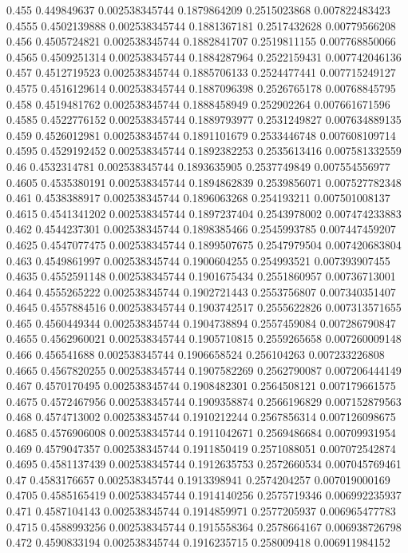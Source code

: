 {0.455 0.449849637 0.002538345744 0.1879864209 0.2515023868 0.007822483423
0.4555 0.4502139888 0.002538345744 0.1881367181 0.2517432628 0.00779566208
0.456 0.4505724821 0.002538345744 0.1882841707 0.2519811155 0.007768850066
0.4565 0.4509251314 0.002538345744 0.1884287964 0.2522159431 0.007742046136
0.457 0.4512719523 0.002538345744 0.1885706133 0.2524477441 0.007715249127
0.4575 0.4516129614 0.002538345744 0.1887096398 0.2526765178 0.00768845795
0.458 0.4519481762 0.002538345744 0.1888458949 0.252902264 0.007661671596
0.4585 0.4522776152 0.002538345744 0.1889793977 0.2531249827 0.007634889135
0.459 0.4526012981 0.002538345744 0.1891101679 0.2533446748 0.007608109714
0.4595 0.4529192452 0.002538345744 0.1892382253 0.2535613416 0.007581332559
0.46 0.4532314781 0.002538345744 0.1893635905 0.2537749849 0.007554556977
0.4605 0.4535380191 0.002538345744 0.1894862839 0.2539856071 0.007527782348
0.461 0.4538388917 0.002538345744 0.1896063268 0.254193211 0.007501008137
0.4615 0.4541341202 0.002538345744 0.1897237404 0.2543978002 0.007474233883
0.462 0.4544237301 0.002538345744 0.1898385466 0.2545993785 0.007447459207
0.4625 0.4547077475 0.002538345744 0.1899507675 0.2547979504 0.007420683804
0.463 0.4549861997 0.002538345744 0.1900604255 0.254993521 0.007393907455
0.4635 0.4552591148 0.002538345744 0.1901675434 0.2551860957 0.00736713001
0.464 0.4555265222 0.002538345744 0.1902721443 0.2553756807 0.007340351407
0.4645 0.4557884516 0.002538345744 0.1903742517 0.2555622826 0.007313571655
0.465 0.4560449344 0.002538345744 0.1904738894 0.2557459084 0.007286790847
0.4655 0.4562960021 0.002538345744 0.1905710815 0.2559265658 0.007260009148
0.466 0.456541688 0.002538345744 0.1906658524 0.256104263 0.007233226808
0.4665 0.4567820255 0.002538345744 0.1907582269 0.2562790087 0.007206444149
0.467 0.4570170495 0.002538345744 0.1908482301 0.2564508121 0.007179661575
0.4675 0.4572467956 0.002538345744 0.1909358874 0.2566196829 0.007152879563
0.468 0.4574713002 0.002538345744 0.1910212244 0.2567856314 0.007126098675
0.4685 0.4576906008 0.002538345744 0.1911042671 0.2569486684 0.00709931954
0.469 0.4579047357 0.002538345744 0.1911850419 0.2571088051 0.007072542874
0.4695 0.4581137439 0.002538345744 0.1912635753 0.2572660534 0.007045769461
0.47 0.4583176657 0.002538345744 0.1913398941 0.2574204257 0.007019000169
0.4705 0.4585165419 0.002538345744 0.1914140256 0.2575719346 0.006992235937
0.471 0.4587104143 0.002538345744 0.1914859971 0.2577205937 0.006965477783
0.4715 0.4588993256 0.002538345744 0.1915558364 0.2578664167 0.006938726798
0.472 0.4590833194 0.002538345744 0.1916235715 0.258009418 0.006911984152
}
